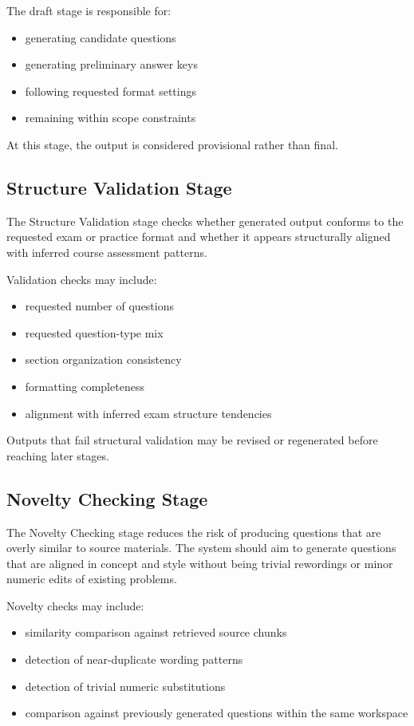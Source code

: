 \documentclass[11pt]{article}
\begin{document}
The draft stage is responsible for:
\begin{itemize}
\item generating candidate questions
\item generating preliminary answer keys
\item following requested format settings
\item remaining within scope constraints
\end{itemize}

At this stage, the output is considered provisional rather than final.

\subsection{Structure Validation Stage}
The Structure Validation stage checks whether generated output conforms to the requested exam or practice format and whether it appears structurally aligned with inferred course assessment patterns.

Validation checks may include:
\begin{itemize}
\item requested number of questions
\item requested question-type mix
\item section organization consistency
\item formatting completeness
\item alignment with inferred exam structure tendencies
\end{itemize}

Outputs that fail structural validation may be revised or regenerated before reaching later stages.

\subsection{Novelty Checking Stage}
The Novelty Checking stage reduces the risk of producing questions that are overly similar to source materials. The system should aim to generate questions that are aligned in concept and style without being trivial rewordings or minor numeric edits of existing problems.

Novelty checks may include:
\begin{itemize}
\item similarity comparison against retrieved source chunks
\item detection of near-duplicate wording patterns
\item detection of trivial numeric substitutions
\item comparison against previously generated questions within the same workspace
\end{itemize}
\end{document}
